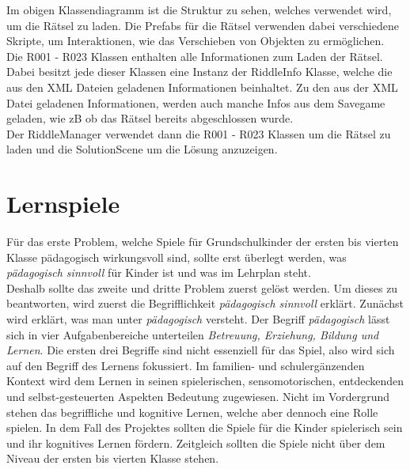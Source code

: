 
Im obigen Klassendiagramm ist die Struktur zu sehen, welches verwendet wird, um die Rätsel zu laden. Die Prefabs für die Rätsel verwenden dabei verschiedene Skripte, um Interaktionen, wie das Verschieben von Objekten zu ermöglichen.\\
Die R001 - R023 Klassen enthalten alle Informationen zum Laden der Rätsel. Dabei besitzt jede dieser Klassen eine Instanz der RiddleInfo Klasse, welche die aus den XML Dateien geladenen Informationen beinhaltet. Zu den aus der XML Datei geladenen Informationen, werden auch manche Infos aus dem Savegame geladen, wie zB ob das Rätsel bereits abgeschlossen wurde.\\
Der RiddleManager verwendet dann die R001 - R023 Klassen um die Rätsel zu laden und die SolutionScene um die Lösung anzuzeigen.

\section{Lernspiele}
Für das erste Problem, welche Spiele für Grundschulkinder der ersten bis vierten Klasse pädagogisch wirkungsvoll sind, sollte erst überlegt werden, was \textit{pädagogisch sinnvoll} für Kinder ist und was im Lehrplan steht.\\
Deshalb sollte das zweite und dritte Problem zuerst gelöst werden. Um dieses zu beantworten, wird zuerst die Begrifflichkeit \textit{pädagogisch sinnvoll} erklärt.  Zunächst wird erklärt, was man unter \textit{pädagogisch} versteht. Der Begriff \textit{pädagogisch} lässt sich in vier Aufgabenbereiche unterteilen \textit{Betreuung, Erziehung, Bildung und Lernen}. Die ersten drei Begriffe sind nicht essenziell für das Spiel, also wird sich auf den Begriff des Lernens fokussiert. Im familien- und schulergänzenden Kontext wird dem Lernen in seinen spielerischen, sensomotorischen, entdeckenden und selbst-gesteuerten Aspekten Bedeutung zugewiesen. Nicht im Vordergrund stehen das begriffliche und kognitive Lernen, welche aber dennoch eine Rolle spielen\autocite{PaedaLog}.
In dem Fall des Projektes sollten die Spiele für die Kinder spielerisch sein und ihr kognitives Lernen fördern. Zeitgleich sollten die Spiele nicht über dem Niveau der ersten bis vierten Klasse stehen.\\

